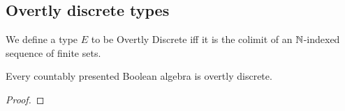 
\subsection{Overtly discrete types}
\begin{definition}
  We define a type $E$ to be Overtly Discrete iff it is the colimit of an $\mathbb{N}$-indexed sequence of finite sets. 
\end{definition} 
\begin{lemma}
  Every countably presented Boolean algebra is overtly discrete.
\end{lemma}
\begin{proof}
\end{proof}
 

